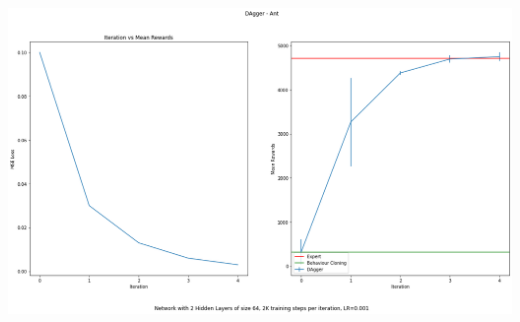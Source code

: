 \documentclass[11pt]{article}
\begin{document}
    \hspace*{-1.0in}
    \includegraphics[scale=0.35]{q2.2.2_plots}
\end{document}

